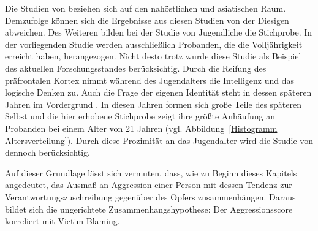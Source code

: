 Die Studien von \textcite{H1_malasia_2012, H1_moderation_2020} beziehen sich auf den nahöstlichen und asiatischen Raum. Demzufolge können sich die Ergebnisse aus diesen Studien von der Diesigen abweichen. Des Weiteren bilden bei der Studie von \textcite{H1_malasia_2012} Jugendliche die Stichprobe. In der vorliegenden Studie werden ausschließlich Probanden, die die Volljährigkeit erreicht haben, herangezogen. Nicht desto trotz wurde diese Studie als Beispiel des aktuellen Forschungsstandes berücksichtig. Durch die Reifung des präfrontalen Kortex nimmt während des Jugendalters die Intelligenz und das logische Denken zu. Auch die Frage der eigenen Identität steht in dessen späteren Jahren im Vordergrund \parencite{H1_Entwicklung}. In diesen Jahren formen sich große Teile des späteren Selbst und die hier erhobene Stichprobe zeigt ihre größte Anhäufung an Probanden bei einem Alter von 21 Jahren (vgl. Abbildung~\ref{Histogramm Altersverteilung}). Durch diese Prozimität an das Jugendalter wird die Studie von \textcite{H1_malasia_2012} dennoch berücksichtig.

Auf dieser Grundlage lässt sich vermuten, dass, wie zu Beginn dieses Kapitels angedeutet, das Ausmaß an Aggression einer Person mit dessen Tendenz zur Verantwortungszuschreibung gegenüber des Opfers zusammenhängen. Daraus bildet sich die ungerichtete Zusammenhangshypothese: Der Aggressionsscore korreliert mit Victim Blaming.